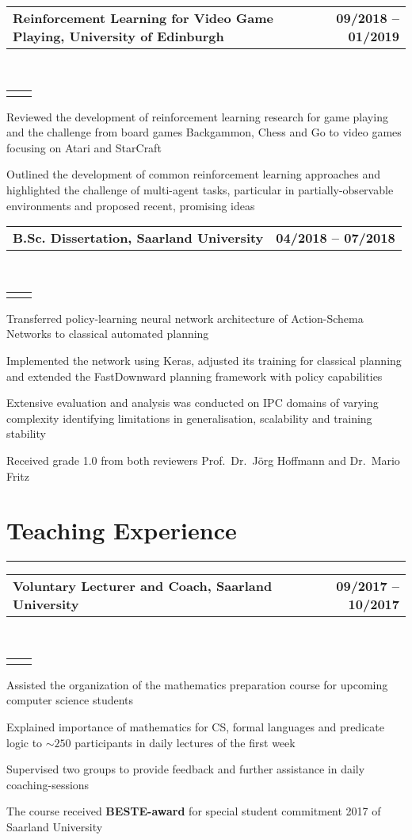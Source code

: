 \documentclass[]{deedy-resume}
\makeatletter
\newcommand{\headerrow}[2]
{\begin{tabular*}{\linewidth}{l@{\extracolsep{\fill}}r}
	\fontspec{Helvetica}\fontsize{12pt}{12pt}\selectfont\bfseries{\color{subheadings}#1} &
	\fontspec{Helvetica}\fontsize{12pt}{12pt}\selectfont\bfseries{\color{subheadings}#2} \\
\end{tabular*}}
\newcommand{\locationrow}[2]
{\begin{tabular*}{\linewidth}{l@{\extracolsep{\fill}}r}
        \color{headings}\scshape\fontspec{Heiti TC Medium}\fontsize{10pt}{12pt}\selectfont{#1}  &
        \color{headings}\scshape\fontspec{Heiti TC Medium}\fontsize{10pt}{12pt}\selectfont{#2}  \\
\end{tabular*}}
\makeatother
\begin{document}
\noindent
\headerrow{Reinforcement Learning for Video Game Playing, University of Edinburgh}{09/2018 -- 01/2019}
\\
\locationrow{Informatics Research Review}{}
\begin{tightitemize}{1.7em}
    \item Reviewed the development of reinforcement learning research for game playing and the challenge from board games
    Backgammon, Chess and Go to video games focusing on Atari and StarCraft
    \item Outlined the development of common reinforcement learning approaches and highlighted the challenge of
    multi-agent tasks, particular in partially-observable environments and proposed recent, promising ideas
\end{tightitemize}
\largesectionsep

\noindent
\headerrow{B.Sc. Dissertation, Saarland University}{04/2018 -- 07/2018}
\\
\locationrow{Foundations of Artificial Intelligence (FAI) Group}{}
\begin{tightitemize}{1.7em}
    \item Transferred policy-learning neural network architecture of Action-Schema Networks to classical automated
    planning
    \item Implemented the network using Keras, adjusted its training for classical planning and extended 
    the FastDownward planning framework with policy capabilities
    \item Extensive evaluation and analysis was conducted on IPC domains of varying complexity identifying
    limitations in generalisation, scalability and training stability
    \item Received grade 1.0 from both reviewers Prof.\ Dr.\ J\"org Hoffmann and Dr.\ Mario Fritz
\end{tightitemize}
\largesectionsep


\section*{Teaching Experience}
\hrule
\vspace{0.4em}

\noindent
\headerrow{Voluntary Lecturer and Coach, Saarland University}{09/2017 -- 10/2017}
\\
\locationrow{Mathematics Preparation Course}{}
\begin{tightitemize}{1.7em}
    \item Assisted the organization of the mathematics preparation course for upcoming computer science students%
    \item Explained importance of mathematics for CS, formal languages and predicate logic to $\sim250$ participants in daily lectures of the first week
    \item Supervised two groups to provide feedback and further assistance in daily coaching-sessions
    \item The course received \textbf{BESTE-award} for special student commitment 2017 of Saarland University
\end{tightitemize}
\largesectionsep
\end{document}
